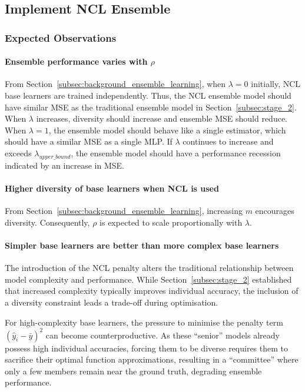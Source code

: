 \subsection{Implement NCL Ensemble}
\label{subsec:evaluation_ncl}
\subsubsection{Expected Observations}
\paragraph{Ensemble performance varies with $\rho$}
From Section~\ref{subsec:background_ensemble_learning}, when $\lambda = 0$ initially, NCL base learners are trained independently. Thus, the NCL ensemble model should have similar MSE as the traditional ensemble model in Section~\ref{subsec:stage_2}. When $\lambda$ increases, diversity should increase and ensemble MSE should reduce. When $\lambda = 1$, the ensemble model should behave like a single estimator, which should have a similar MSE as a single MLP. If $\lambda$ continues to increase and exceeds $\lambda_{upper\_bound}$, the ensemble model should have a performance recession indicated by an increase in MSE. 

\paragraph{Higher diversity of base learners when NCL is used}
From Section~\ref{subsec:background_ensemble_learning}, increasing $m$ encourages diversity. Consequently, $\rho$ is expected to scale proportionally with $\lambda$. 

\paragraph{Simpler base learners are better than more complex base learners}
The introduction of the NCL penalty alters the traditional relationship between model complexity and performance. While Section~\ref{subsec:stage_2} established that increased complexity typically improves individual accuracy, the inclusion of a diversity constraint leads a trade-off during optimisation. 

For high-complexity base learners, the pressure to minimise the penalty term $(\hat{y}_i - \bar{y})^2$ can become counterproductive. As these ``senior'' models already possess high individual accuracies, forcing them to be diverse requires them to sacrifice their optimal function approximations, resulting in a ``committee'' where only a few members remain near the ground truth, degrading ensemble performance. 

